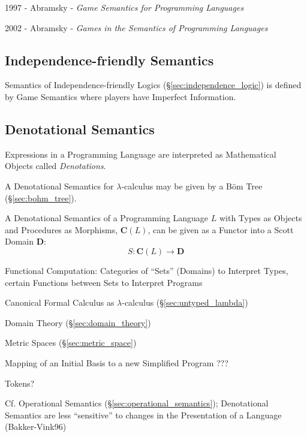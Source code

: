 1997 - Abramsky - \emph{Game Semantics for Programming Languages}

2002 - Abramsky - \emph{Games in the Semantics of Programming Languages}



\subsection{Independence-friendly Semantics}
\label{sec:independence_semantics}

Semantics of Independence-friendly Logics
(\S\ref{sec:independence_logic}) is defined by Game Semantics where
players have Imperfect Information.



\subsection{Denotational Semantics}\label{sec:denotational_semantics}

Expressions in a Programming Language are interpreted as Mathematical
Objects called \emph{Denotations}.

A Denotational Semantics for $\lambda$-calculus may be given by a
B\"om Tree (\S\ref{sec:bohm_tree}).

A Denotational Semantics of a Programming Language $L$ with Types as
Objects and Procedures as Morphisms, $\mathbf{C}(L)$, can be given as
a Functor into a Scott Domain $\mathbf{D}$: \cite{awodey06}
\[
  S : \mathbf{C}(L) \rightarrow \mathbf{D}
\]

Functional Computation: Categories of ``Sets'' (Domains) to Interpret
Types, certain Functions between Sets to Interpret Programs

Canonical Formal Calculus as $\lambda$-calculus
(\S\ref{sec:untyped_lambda})

Domain Theory (\S\ref{sec:domain_theory})

Metric Spaces (\S\ref{sec:metric_space})

Mapping of an Initial Basis to a new Simplified Program ??? %

Tokens?

\fist Cf. Operational Semantics (\S\ref{sec:operational_semantics});
Denotational Semantics are less ``sensitive'' to changes in the
Presentation of a Language (Bakker-Vink96) %

